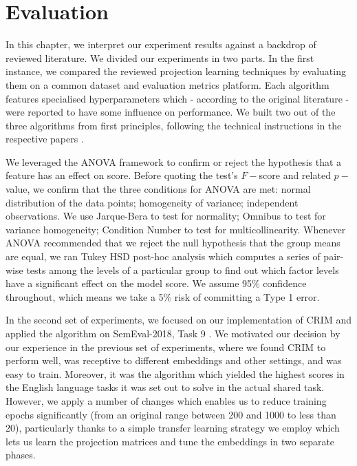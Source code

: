 \chapter{Evaluation}
In this chapter, we interpret our experiment results against a backdrop of reviewed literature.  We divided our experiments in two parts.  In the first instance, we compared the reviewed projection learning techniques by evaluating them on a common dataset and evaluation metrics platform.  Each algorithm features specialised hyperparameters which - according to the original literature - were reported to have some influence on performance.  We built two out of the three algorithms from first principles, following the technical instructions in the respective papers \citep{ustalov2017negative, bernier2018crim}.  

We leveraged the \ac{ANOVA} framework to confirm or reject the hypothesis that a feature has an effect on score.  Before quoting the test's $F-$score and related $p-$value, we confirm that the three conditions for \ac{ANOVA} are met: normal distribution of the data points; homogeneity of variance; independent observations.  We use Jarque-Bera to test for normality; Omnibus to test for variance homogeneity; Condition Number to test for multicollinearity.  Whenever \ac{ANOVA} recommended that we reject the null hypothesis that the group means are equal, we ran Tukey \ac{HSD} post-hoc analysis which computes a series of pair-wise tests among the levels of a particular group to find out which factor levels have a significant effect on the model score.  We assume 95\% confidence throughout, which means we take a 5\% risk of committing a Type 1 error.

In the second set of experiments, we focused on our implementation of CRIM \citep{bernier2018crim} and applied the algorithm on SemEval-2018, Task 9 \citep{camacho2018semeval}.  We motivated our decision by our experience in the previous set of experiments, where we found CRIM to perform well, was receptive to different embeddings and other settings, and was easy to train.  Moreover, it was the algorithm which yielded the highest scores in the English language tasks it was set out to solve in the actual shared task.  However, we apply a number of changes which enables us to reduce training epochs significantly (from an original range between 200 and 1000 to less than 20), particularly thanks to a simple transfer learning strategy we employ which lets us learn the projection matrices and tune the embeddings in two separate phases.

